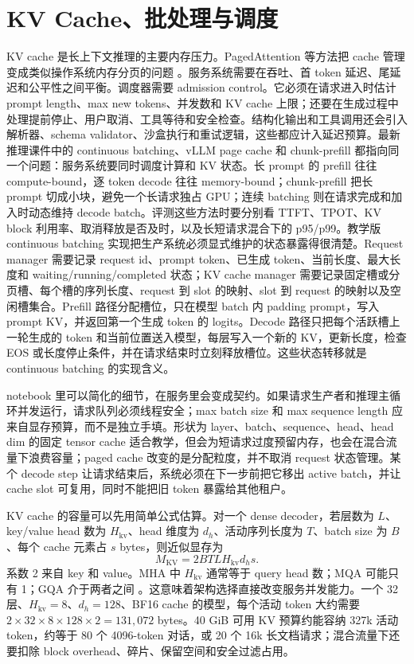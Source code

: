 \documentclass[UTF8,zihao=-4,openany]{ctexbook}
\begin{document}
\section{KV Cache、批处理与调度}
KV cache 是长上下文推理的主要内存压力。PagedAttention 等方法把 cache 管理变成类似操作系统内存分页的问题 \cite{kwon2023efficient}。服务系统需要在吞吐、首 token 延迟、尾延迟和公平性之间平衡。调度器需要 admission control。它必须在请求进入时估计 prompt length、max new tokens、并发数和 KV cache 上限；还要在生成过程中处理提前停止、用户取消、工具等待和安全检查。结构化输出和工具调用还会引入解析器、schema validator、沙盒执行和重试逻辑，这些都应计入延迟预算。最新推理课件中的 continuous batching、vLLM page cache 和 chunk-prefill 都指向同一个问题：服务系统要同时调度计算和 KV 状态。长 prompt 的 prefill 往往 compute-bound，逐 token decode 往往 memory-bound；chunk-prefill 把长 prompt 切成小块，避免一个长请求独占 GPU；连续 batching 则在请求完成和加入时动态维持 decode batch。评测这些方法时要分别看 TTFT、TPOT、KV block 利用率、取消释放是否及时，以及长短请求混合下的 p95/p99。教学版 continuous batching 实现把生产系统必须显式维护的状态暴露得很清楚。Request manager 需要记录 request id、prompt token、已生成 token、当前长度、最大长度和 waiting/running/completed 状态；KV cache manager 需要记录固定槽或分页槽、每个槽的序列长度、request 到 slot 的映射、slot 到 request 的映射以及空闲槽集合。Prefill 路径分配槽位，只在模型 batch 内 padding prompt，写入 prompt KV，并返回第一个生成 token 的 logits。Decode 路径只把每个活跃槽上一轮生成的 token 和当前位置送入模型，每层写入一个新的 KV，更新长度，检查 EOS 或长度停止条件，并在请求结束时立刻释放槽位。这些状态转移就是 continuous batching 的实现含义。

notebook 里可以简化的细节，在服务里会变成契约。如果请求生产者和推理主循环并发运行，请求队列必须线程安全；max batch size 和 max sequence length 应来自显存预算，而不是独立手填。形状为 layer、batch、sequence、head、head dim 的固定 tensor cache 适合教学，但会为短请求过度预留内存，也会在混合流量下浪费容量；paged cache 改变的是分配粒度，并不取消 request 状态管理。某个 decode step 让请求结束后，系统必须在下一步前把它移出 active batch，并让 cache slot 可复用，同时不能把旧 token 暴露给其他租户。

KV cache 的容量可以先用简单公式估算。对一个 dense decoder，若层数为 $L$、key/value head 数为 $H_{\mathrm{kv}}$、head 维度为 $d_h$、活动序列长度为 $T$、batch size 为 $B$、每个 cache 元素占 $s$ bytes，则近似显存为
\[
  M_{\mathrm{KV}}=2BTLH_{\mathrm{kv}}d_hs .
\]
系数 2 来自 key 和 value。MHA 中 $H_{\mathrm{kv}}$ 通常等于 query head 数；MQA 可能只有 1；GQA 介于两者之间 \cite{shazeer2019fast,ainslie2023gqa}。这意味着架构选择直接改变服务并发能力。一个 32 层、$H_{\mathrm{kv}}=8$、$d_h=128$、BF16 cache 的模型，每个活动 token 大约需要 $2\times32\times8\times128\times2=131{,}072$ bytes。40 GiB 可用 KV 预算约能容纳 327k 活动 token，约等于 80 个 4096-token 对话，或 20 个 16k 长文档请求；混合流量下还要扣除 block overhead、碎片、保留空间和安全过滤占用。
\end{document}
